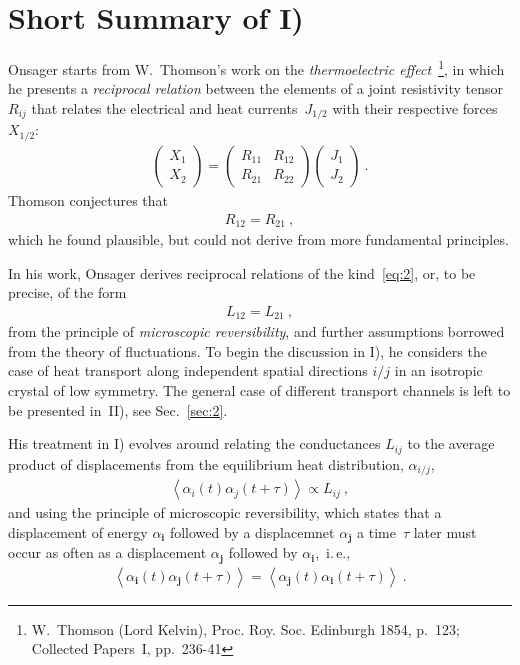 \documentclass[a4paper]{article}
\begin{document}
\section{Short Summary of I)}
Onsager starts from W.~Thomson's work on the \emph{thermoelectric effect}~\footnote{W.~Thomson (Lord Kelvin), Proc. Roy. Soc. Edinburgh 1854, p.~123; Collected Papers~I, pp.~236-41}, in which he presents a \emph{reciprocal relation}
between the elements of a joint resistivity tensor $R_{ij}$ that relates the electrical and heat currents~$J_{1/2}$ with their respective forces~$X_{1/2}$:
\begin{align}
    \begin{pmatrix} 
        X_1 \\ X_2 
    \end{pmatrix}
    =
    \begin{pmatrix} 
        R_{11} & R_{12} \\
        R_{21} & R_{22}
    \end{pmatrix}
    \begin{pmatrix} 
        J_1 \\ J_2 
    \end{pmatrix}~.
    \label{eq:1}
\end{align}
Thomson conjectures that
\begin{align}
    R_{12} = R_{21}~,
    \label{eq:2}
\end{align}
which he found plausible, but could not derive from more fundamental principles.

In his work, Onsager derives reciprocal relations of the kind~\eqref{eq:2}, or, to be precise, of the form
\begin{align}
    L_{12} = L_{21}~,
    \label{eq:3}
\end{align}
from the principle of \emph{microscopic reversibility}, and further assumptions borrowed from the theory of fluctuations. To begin the discussion in I), he considers the case of heat transport along independent spatial directions $i/j$ in an isotropic crystal of low symmetry. The general case of different transport channels is left to be presented in~II), see Sec.~\ref{sec:2}. 

His treatment in I) evolves around relating the conductances $L_{ij}$ to the average product of displacements from the equilibrium heat distribution, $\alpha_{i/j}$,
\begin{align}
    \left\langle \alpha_i (t) \alpha_j ( t + \tau ) \right\rangle
    \propto L_{ij}
    ~,
    \label{eq:4}
\end{align}
and using the principle of microscopic reversibility, which states that a displacement of energy $\alpha_{\boldsymbol{i}}$ followed by a displacemnet $\alpha_{\boldsymbol{j}}$ a time~$\tau$ later must occur as often as a displacement $\alpha_{\boldsymbol{j}}$ followed by $\alpha_{\boldsymbol{i}}$,~i.\,e.,%
\begin{align}
    \left\langle \alpha_{\boldsymbol{i}} (t) \alpha_{\boldsymbol{j}} ( t + \tau ) \right\rangle
    =
    \left\langle \alpha_{\boldsymbol{j}} (t) \alpha_{\boldsymbol{i}} ( t + \tau ) \right\rangle
    ~.
    \label{eq:5}
\end{align}
\end{document}
